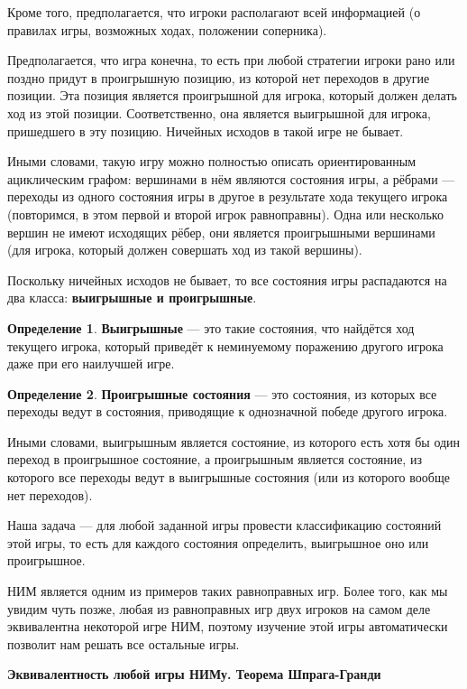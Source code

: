 \documentclass[aps,%
12pt,%
final,%
oneside,
onecolumn,%
musixtex, %
superscriptaddress,%
centertags]{article} %
\theoremstyle{plain}
\theoremstyle{definition}
\newtheorem{definition}{Определение}[subsection]
\theoremstyle{remark}
\begin{document}
Кроме того, предполагается, что игроки располагают всей информацией (о правилах игры, возможных ходах, положении соперника).

Предполагается, что игра конечна, то есть при любой стратегии игроки рано или поздно придут в проигрышную позицию, из которой нет переходов в другие позиции. Эта позиция является проигрышной для игрока, который должен делать ход из этой позиции. Соответственно, она является выигрышной для игрока, пришедшего в эту позицию. Ничейных исходов в такой игре не бывает.

Иными словами, такую игру можно полностью описать ориентированным ациклическим графом: вершинами в нём являются состояния игры, а рёбрами — переходы из одного состояния игры в другое в результате хода текущего игрока (повторимся, в этом первой и второй игрок равноправны). Одна или несколько вершин не имеют исходящих рёбер, они является проигрышными вершинами (для игрока, который должен совершать ход из такой вершины).

Поскольку ничейных исходов не бывает, то все состояния игры распадаются на два класса: \textbf{выигрышные и проигрышные}. 

\begin{definition}
  \textbf{Выигрышные} — это такие состояния, что найдётся ход текущего игрока, который приведёт к неминуемому поражению другого игрока даже при его наилучшей игре.
\end{definition}
\begin{definition}
   \textbf{Проигрышные состояния} — это состояния, из которых все переходы ведут в состояния, приводящие к однозначной победе другого игрока.
 \end{definition}  

 Иными словами, выигрышным является состояние, из которого есть хотя бы один переход в проигрышное состояние, а проигрышным является состояние, из которого все переходы ведут в выигрышные состояния (или из которого вообще нет переходов).

 Наша задача — для любой заданной игры провести классификацию состояний этой игры, то есть для каждого состояния определить, выигрышное оно или проигрышное.

 НИМ является одним из примеров таких равноправных игр. Более того, как мы увидим чуть позже, любая из равноправных игр двух игроков на самом деле эквивалентна некоторой игре НИМ, поэтому изучение этой игры автоматически позволит нам решать все остальные игры.

\textbf{Эквивалентность любой игры НИМу. Теорема Шпрага-Гранди}
\end{document}
